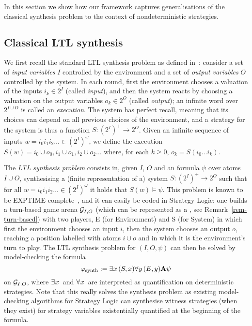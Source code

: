 In this section we show how our framework captures generalisations of
the classical \LTL synthesis problem to the context of nondeterministic strategies.

\subsection{Classical LTL synthesis}
\label{sec-ltl-synth}

We first recall the standard LTL synthesis problem as defined
in~\cite{pnueli1989synthesisshort}: consider a set of \emph{input
  variables} $I$ controlled by the environment and a set of
\emph{output variables} $O$ controlled by the system. In each round,
first the environment chooses a valuation of the inputs $i_k\in 2^I$
(called \emph{input}), and then the system reacts by choosing a
valuation on the output variables $o_k\in 2^O$ (called \emph{output});
an infinite word over $2^{I\cup O}$ is called an
\emph{execution}. The system has perfect recall, meaning that its
choices can depend on all previous choices of the environment, and a
strategy for the system is thus a function $S:(2^I)^+\to 2^O$. Given
an infinite sequence of inputs $w=i_0i_1i_2\ldots \in (2^I)^\omega$, we
define the execution $S(w)=i_0\cup o_0, i_1\cup o_1, i_2\cup o_2\ldots$ where,
for each $k\geq 0$, $o_k=S(i_0\ldots i_k)$.

The \emph{LTL synthesis problem} consists in,
given $I$, $O$ and an \LTL formula $\psi$ over atoms $I\cup O$,
synthesising a (finite representation of a) system $S:(2^I)^+\to 2^O$ such
that for all $w=i_0i_1i_2\ldots\in (2^I)^\omega$ it holds that $S(w)\models\psi$.
This problem is known to be
\2EXPTIME-complete~\cite{pnueli1989synthesisshort}, and it can easily
be coded in Strategy Logic: one builds a turn-based game arena $\CGS_{I,O}$ (which
can be represented as a \CGS, see Remark~\ref{rem-turn-based}) with
two players, E (for Environment) and S (for System) in
which first the environment chooses an input $i$, then the system chooses
an output $o$, reaching a position labelled with atoms $i\cup o$ and in which it is
the environment's turn to play. The LTL synthesis problem for $(I,O,\psi)$ can
then be solved by model-checking the \SL formula
\[\phisynth:=\Estratnd (S,\var) \Astratnd[\varb] (E,\varb) \A \psi\]
on $\CGS_{I,O}$, where $\Estratnd$ and $\Astratnd$ are interpreted as
quantification on deterministic strategies. Note that this really solves the synthesis
problem as existing model-checking algorithms for Strategy Logic can
synthesise  witness strategies (when they exist) for strategy variables existentially
quantified at the beginning of the formula.

